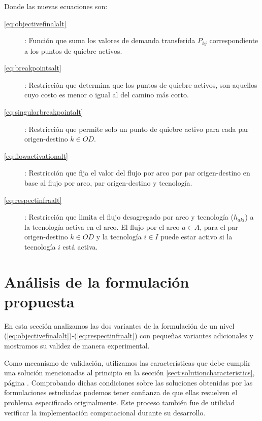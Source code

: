 Donde las nuevas ecuaciones son:

\begin{description}
  \item[\ref{eq:objectivefinalalt}]: Función que suma los valores de demanda transferida $P_{kj}$ correspondiente a los puntos de quiebre activos.
  \item[\ref{eq:breakpointsalt}]: Restricción que determina que los puntos de quiebre activos, son aquellos cuyo costo es menor o igual al del camino más corto.
  \item[\ref{eq:singularbreakpointalt}]: Restricción que permite solo un punto de quiebre activo para cada par origen-destino $k \in OD$.
  \item[\ref{eq:flowactivationalt}]: Restricción que fija el valor del flujo por arco por par origen-destino en base al flujo por arco, par origen-destino y tecnología.
  \item[\ref{eq:respectinfraalt}]: Restricción que limita el flujo desagregado por arco y tecnología ($h_{aki}$) a la tecnología activa en el arco. El flujo por el arco $a \in A$, para el par origen-destino $k \in OD$ y la tecnología $i \in I$ puede estar activo si la tecnología $i$ está activa.
\end{description}

\section{Análisis de la formulación propuesta}

En esta sección analizamos las dos variantes de la formulación de un nivel (\ref{eq:objectivefinalalt})-(\ref{eq:respectinfraalt}) con pequeñas variantes adicionales y mostramos su validez de manera experimental.

Como mecanismo de validación, utilizamos las características que debe cumplir una solución mencionadas al principio en la sección \ref{sect:solutioncharacteristics}, página \pageref{sect:solutioncharacteristics}. Comprobando dichas condiciones sobre las soluciones obtenidas por las formulaciones estudiadas podemos tener confianza de que ellas resuelven el problema especificado originalmente. Este proceso también fue de utilidad verificar la implementación computacional durante su desarrollo.


